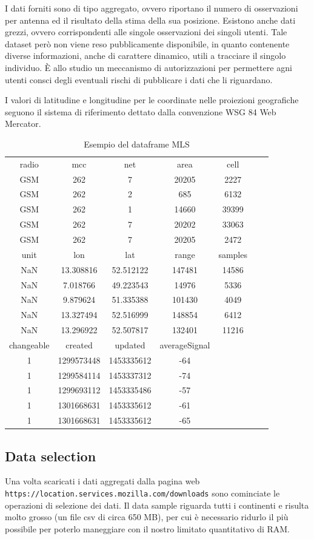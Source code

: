 I dati forniti sono di tipo aggregato, ovvero riportano il numero di osservazioni per antenna ed il risultato della stima della sua posizione. Esistono anche dati grezzi, ovvero corrispondenti alle singole osservazioni dei singoli utenti. Tale dataset però non viene reso pubblicamente disponibile, in quanto contenente diverse informazioni, anche di carattere dinamico, utili a tracciare il singolo individuo. È allo studio un meccanismo di autorizzazioni per permettere agni utenti consci degli eventuali rischi di pubblicare i dati che li riguardano.

I valori di latitudine e longitudine per le coordinate nelle proiezioni geografiche seguono il sistema di riferimento dettato dalla convenzione WSG 84 Web Mercator.
\begin{table}[ht!]
\centering
\caption{Esempio del dataframe MLS}
	\begin{tabular}{ccccccc}
	\toprule
radio 	&mcc 	&net &area 	&cell \\	
GSM 		&262 	&7 	&20205 	&2227 \\	
GSM 		&262 	&2 	&685		&6132 \\	
GSM 		&262 	&1 	&14660 	&39399 \\	
GSM 		&262 	&7 	&20202 	&33063 \\
GSM 		&262 	&7 	&20205 	&2472 \\
\midrule
unit 		 &lon	&lat 		&range 	&samples \\
NaN		&13.308816 	&52.512122	&147481 	&14586 \\
NaN		&7.018766 	&49.223543	&14976 	&5336 \\
NaN		&9.879624 	&51.335388	&101430 	&4049 \\	
NaN		&13.327494	&52.516999	&148854 	&6412 \\	
NaN		&13.296922	&52.507817	&132401 	&11216 \\	
\midrule
changeable 	&created 		&updated 		&averageSignal\\
1 			&1299573448 	&1453335612 	&-64\\
1 			&1299584114 	&1453337312 	&-74\\
1 			&1299693112 	&1453335486 	&-57\\
1 			&1301668631 	&1453335612 	&-61\\
1 			&1301668631 	&1453335612 	&-65\\
\bottomrule
	\end{tabular}
\label{tab:esempiodati}
\end{table}

\subsection{Data selection}
Una volta scaricati i dati aggregati dalla pagina web \lstinline{https://location.services.mozilla.com/downloads} sono cominciate le operazioni di selezione dei dati. Il data sample riguarda tutti i continenti e risulta molto grosso (un file csv di circa 650 MB), per cui è necessario ridurlo il più possibile per poterlo maneggiare con il nostro limitato quantitativo di RAM.

